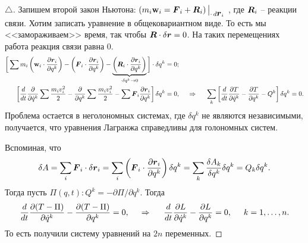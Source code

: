 \begin{proof}[$\triangle$]
Запишем второй закон Ньютона:
$
    \left(
        m_i \mbox{\boldmath $\mathrm{w}$}_i = \mbox{\boldmath $F$}_i + \mbox{\boldmath $R$}_i
    \right)\big|_{\cdot \, d \mbox{\boldmath $r$}_i}
$
, где $\mbox{\boldmath $R$}_i$ -- реакции связи. Хотим записать уравнение в общековариантном виде.
То есть мы <<замораживаем>> время, так чтобы $\mbox{\boldmath $R$} \cdot \delta \mbox{\boldmath $r$} = 0$. На таких перемещениях работа реакция связи равна 0.
\begin{align*}
    \bigg[
        \sum m_i \left(\mbox{\boldmath $\mathrm{w}$}_i \cdot \frac{\partial \mbox{\boldmath $r$}_i}{\partial q^k} \right)
        -
        \left(\mbox{\boldmath $F$}_i \cdot \frac{\partial \mbox{\boldmath $r$}_i}{\partial q^k} \right)
        -
        \underbrace{
        \left(
            \mbox{\boldmath $R$}_i \cdot \frac{\partial \mbox{\boldmath $r$}_i}{\partial q^k} 
        \right)}_{\cdot \delta q^k \to 0}
    \bigg] \cdot \delta q^k &= 0;
    \\
    \left[
        \frac{d}{dt} \frac{\partial }{\partial \dot{q}^k} \sum  \frac{m_i v_i^2}{2} 
        -
        \frac{\partial }{\partial q^k} \sum \frac{m_i v_i^2}{2} -
        \sum \mbox{\boldmath $F$}_i \frac{\partial \mbox{\boldmath $r$}_i}{\partial q^k} 
    \right] \delta q^k &= 0
    , \hspace{0.5cm} \Rightarrow \hspace{0.5cm} 
    \sum_k
    \left[
        \frac{d}{dt} \frac{\partial T}{\partial \dot{q}^k} 
        - \frac{\partial T}{\partial q^k} - Q^k
    \right] \delta q^k = 0.
\end{align*}
Проблема остается в неголономных системах, где $\delta q^k$ не являются независимыми, получается, что уравнения Лагранжа справедливы для голономных систем.

Вспоминая, что
\begin{equation*}
    \delta  A = \sum_i \mbox{\boldmath $F$}_i \cdot \delta \mbox{\boldmath $r$}_i =
    \sum_i \left(\mbox{\boldmath $F$}_i \cdot \frac{\partial \mbox{\boldmath $r$}_i}{\partial q^k}\right) \delta q^k =
    \sum_k 
    \frac{\delta A_k}{\delta q^k} \delta q^k = Q_k \delta q^k.
\end{equation*}
Тогда пусть $\Pi (q, t) \colon Q^k = - \partial \Pi / \partial q^k$.  Тогда
\begin{equation*}
    \frac{d}{dt} \frac{\partial (T-\Pi)}{\partial \dot{q}^k} - \frac{\partial (T - \Pi)}{\partial q^k}  = 0,
    \hspace{0.5cm} \Rightarrow \hspace{0.5cm} 
    \frac{d}{dt} \frac{\partial L}{\partial \dot{q}^k} - \frac{\partial L}{\partial q^k} = 0, \hspace{0.5cm} k = 1, \ldots, n.
\end{equation*}
То есть получили систему уравнений на $2n$ переменных.
\end{proof}




